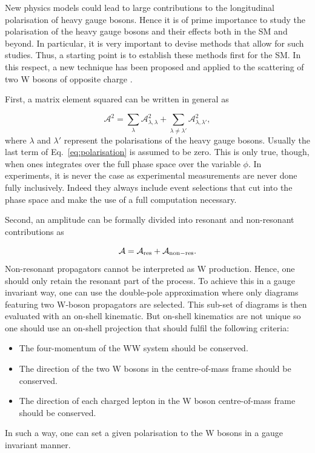 New physics models could lead to large contributions to the longitudinal polarisation of heavy gauge bosons.
Hence it is of prime importance to study the polarisation of the heavy gauge bosons and their effects both in the SM and beyond.
In particular, it is very important to devise methods that allow for such studies.
Thus, a starting point is to establish these methods first for the SM.
In this respect, a new technique has been proposed and applied to the scattering of two W bosons of opposite charge \cite{Ballestrero:2017bxn}.

First, a matrix element squared can be written in general as

\begin{equation}
\label{eq:polarisation}
 \mathcal{A}^2 = \sum_{\lambda} \mathcal{A}^2_{\lambda, \lambda} + \sum_{\lambda \neq \lambda'} \mathcal{A}^2_{\lambda, \lambda'}, 
\end{equation}
%
where $\lambda$ and $\lambda'$ represent the polarisations of the heavy gauge bosons.
Usually the last term of Eq.~\eqref{eq:polarisation} is assumed to be zero.
This is only true, though, when ones integrates over the full phase space over the variable $\phi$.
In experiments, it is never the case as experimental measurements are never done fully inclusively.
Indeed they always include event selections that cut into the phase space and make the use of a full computation necessary.

Second, an amplitude can be formally divided into resonant and non-resonant contributions as

\begin{equation}
\mathcal{A} = \mathcal{A}_{\rm res} + \mathcal{A}_{\rm non-res} .
\end{equation}
%
Non-resonant propagators cannot be interpreted as W production.
Hence, one should only retain the resonant part of the process.
To achieve this in a gauge invariant way, one can use the double-pole approximation where only diagrams featuring two W-boson propagators are selected.
This sub-set of diagrams is then evaluated with an on-shell kinematic.
But on-shell kinematics are not unique so one should use an on-shell projection that should fulfil the following criteria:
\begin{itemize}
 \item The four-momentum of the WW system should be conserved.
 \item The direction of the two W bosons in the centre-of-mass frame should be conserved.
 \item The direction of each charged lepton in the W boson centre-of-mass frame should be conserved.
\end{itemize}
%
In such a way, one can set a given polarisation to the W bosons in a gauge invariant manner.

